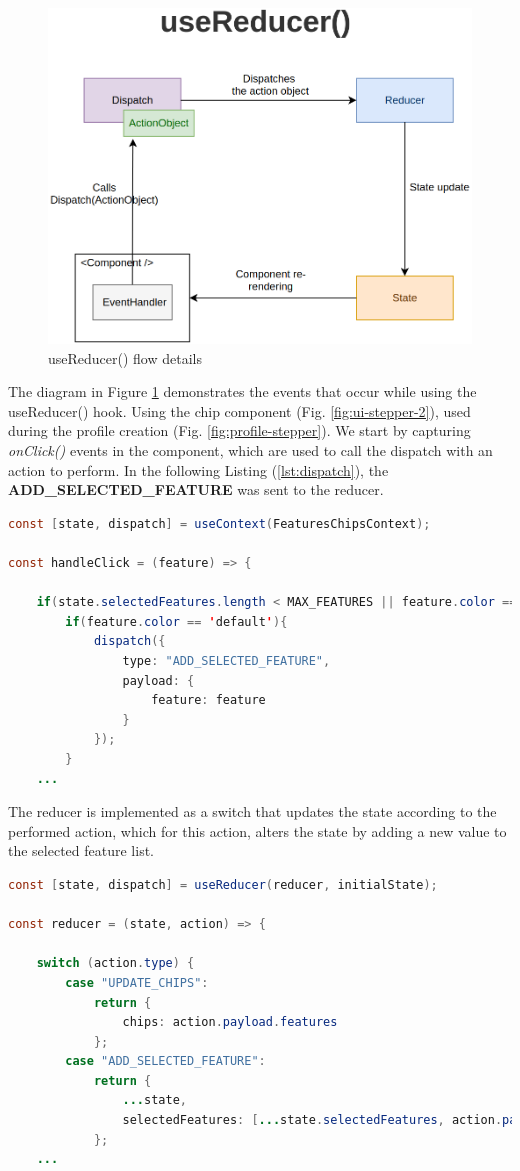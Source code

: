 \begin{figure}[h]
	\centering
	\includegraphics[width=0.5\linewidth]{Chapters/img/frontend/useReducer.png}
	\caption{useReducer() flow details~\cite{react-use-reducer}}
	\label{fig:useReducer}
\end{figure}

The diagram in Figure \ref{fig:useReducer} demonstrates the events that occur while using the useReducer() hook. Using the chip component (Fig. \ref{fig:ui-stepper-2}), used during the profile creation (Fig. \ref{fig:profile-stepper}). We start by capturing \textit{onClick()} events in the component, which are used to call the dispatch with an action to perform. In the following Listing (\ref{lst:dispatch}), the \textbf{ADD\_SELECTED\_FEATURE} was sent to the reducer.

\begin{lstlisting}[language=Java, caption={EventHandler dispatching actions}, label={lst:dispatch}]
const [state, dispatch] = useContext(FeaturesChipsContext);

const handleClick = (feature) => {

    if(state.selectedFeatures.length < MAX_FEATURES || feature.color == 'primary'){
        if(feature.color == 'default'){
            dispatch({
                type: "ADD_SELECTED_FEATURE",
                payload: {
                    feature: feature
                }
            });
        }
    ...
\end{lstlisting}

The reducer is implemented as a switch that updates the state according to the performed action, which for this action, alters the state by adding a new value to the selected feature list.

\begin{lstlisting}[language=Java, caption={Reducer processing actions}, label={lst:reducer}]
const [state, dispatch] = useReducer(reducer, initialState);

const reducer = (state, action) => {

    switch (action.type) {
        case "UPDATE_CHIPS":
            return {
                chips: action.payload.features
            };
        case "ADD_SELECTED_FEATURE":
            return {
                ...state,
                selectedFeatures: [...state.selectedFeatures, action.payload.feature.value]
            };
    ...
\end{lstlisting}

